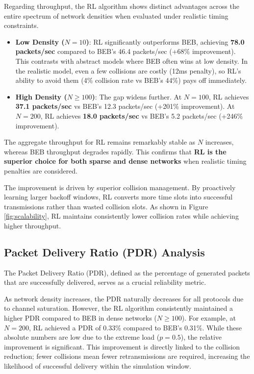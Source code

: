 \documentclass[12pt,a4paper,oneside]{article}
\theoremstyle{definition}
\begin{document}
Regarding throughput, the RL algorithm shows distinct advantages across the entire spectrum of network densities when evaluated under realistic timing constraints.

\begin{itemize}
    \item \textbf{Low Density ($N = 10$)}: RL significantly outperforms BEB, achieving \textbf{78.0 packets/sec} compared to BEB's 46.4 packets/sec (+68\% improvement). This contrasts with abstract models where BEB often wins at low density. In the realistic model, even a few collisions are costly (12ms penalty), so RL's ability to avoid them (4\% collision rate vs BEB's 44\%) pays off immediately.
    
    \item \textbf{High Density ($N \ge 100$)}: The gap widens further. At $N=100$, RL achieves \textbf{37.1 packets/sec} vs BEB's 12.3 packets/sec (+201\% improvement). At $N=200$, RL achieves \textbf{18.0 packets/sec} vs BEB's 5.2 packets/sec (+246\% improvement).
\end{itemize}

The aggregate throughput for RL remains remarkably stable as $N$ increases, whereas BEB throughput degrades rapidly. This confirms that \textbf{RL is the superior choice for both sparse and dense networks} when realistic timing penalties are considered.

The improvement is driven by superior collision management. By proactively learning larger backoff windows, RL converts more time slots into successful transmissions rather than wasted collision slots. As shown in Figure \ref{fig:scalability}, RL maintains consistently lower collision rates while achieving higher throughput.

\subsection{Packet Delivery Ratio (PDR) Analysis}

The Packet Delivery Ratio (PDR), defined as the percentage of generated packets that are successfully delivered, serves as a crucial reliability metric.

As network density increases, the PDR naturally decreases for all protocols due to channel saturation. However, the RL algorithm consistently maintained a higher PDR compared to BEB in dense networks ($N \ge 100$). For example, at $N=200$, RL achieved a PDR of 0.33\% compared to BEB's 0.31\%. While these absolute numbers are low due to the extreme load ($p=0.5$), the relative improvement is significant. This improvement is directly linked to the collision reduction; fewer collisions mean fewer retransmissions are required, increasing the likelihood of successful delivery within the simulation window.
\end{document}
